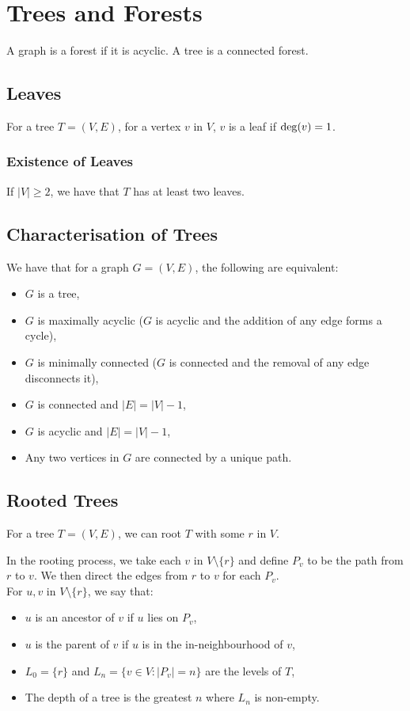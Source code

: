 \section{Trees and Forests}

A graph is a forest if it is acyclic.
A tree is a connected forest.

\subsection{Leaves}

For a tree $T = (V, E)$, for a vertex $v$ in $V$, $v$ is a leaf
if $\operatorname{deg}(v) = 1$. 

\subsubsection{Existence of Leaves}

If $|V| \geq 2$, we have that $T$ has at least two leaves.

\subsection{Characterisation of Trees}

We have that for a graph $G = (V, E)$, the following are equivalent:
\begin{itemize}
  \item $G$ is a tree,
  \item $G$ is maximally acyclic ($G$ is acyclic and the addition
  of any edge forms a cycle),
  \item $G$ is minimally connected ($G$ is connected and the removal
  of any edge disconnects it),
  \item $G$ is connected and $|E| = |V| - 1$,
  \item $G$ is acyclic and $|E| = |V| - 1$,
  \item Any two vertices in $G$ are connected by a unique path.
\end{itemize}

\subsection{Rooted Trees}

For a tree $T = (V, E)$, we can root $T$ with some $r$ in $V$.

In the rooting process, we take each $v$ in $V\setminus\{r\}$ and 
define $P_v$ to be the path from $r$ to $v$. We then direct the edges 
from $r$ to $v$ for each $P_v$.
\\[\baselineskip]
For $u, v$ in $V\setminus\{r\}$, we say that: \begin{itemize}
  \item $u$ is an ancestor of $v$ if $u$ lies on $P_v$,
  \item $u$ is the parent of $v$ if $u$ is in the
  in-neighbourhood of $v$,
  \item $L_0 = \{r\}$ and $L_n = \{v \in V : |P_v| = n\}$ are the 
  levels of $T$,
  \item The depth of a tree is the greatest $n$ where
  $L_n$ is non-empty.
\end{itemize} 